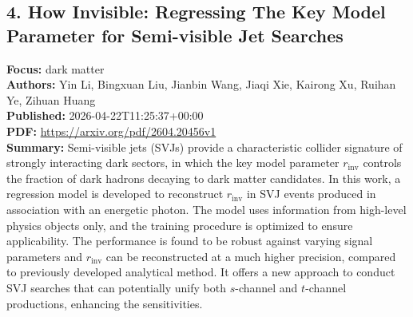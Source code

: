 \documentclass[11pt]{article}
\begin{document}
\subsection*{4. How Invisible: Regressing The Key Model Parameter for Semi-visible Jet Searches}
\textbf{Focus:} dark matter\\
\textbf{Authors:} Yin Li, Bingxuan Liu, Jianbin Wang, Jiaqi Xie, Kairong Xu, Ruihan Ye, Zihuan Huang\\
\textbf{Published:} 2026-04-22T11:25:37+00:00\\
\textbf{PDF:} \href{https://arxiv.org/pdf/2604.20456v1}{https://arxiv.org/pdf/2604.20456v1}\\
\textbf{Summary:}
Semi-visible jets (SVJs) provide a characteristic collider signature of strongly interacting dark sectors, in which the key model parameter $r_{\mathrm{inv}}$ controls the fraction of dark hadrons decaying to dark matter candidates. In this work, a regression model is developed to reconstruct $r_{\mathrm{inv}}$ in SVJ events produced in association with an energetic photon. The model uses information from high-level physics objects only, and the training procedure is optimized to ensure applicability. The performance is found to be robust against varying signal parameters and $r_{\mathrm{inv}}$ can be reconstructed at a much higher precision, compared to previously developed analytical method. It offers a new approach to conduct SVJ searches that can potentially unify both $s$-channel and $t$-channel productions, enhancing the sensitivities.
\newpage
\end{document}
